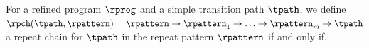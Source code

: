 \begin{enumerate}
%
  \begin{defn}
    \label{def:repeatchain-loop}
  For a refined program $\rprog$ and a simple transition path $\tpath$, we define
  $\rpch(\tpath, \rpattern) = \rpattern \to \rpattern_1 \to \ldots \to \rpattern_{m} \to \tpath$
  a repeat chain for $\tpath$ in the repeat pattern $\rpattern$
  if and only if,

\end{defn}
\end{enumerate}
